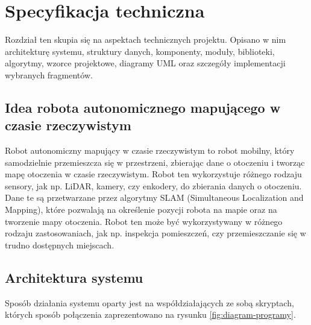 \documentclass[a4paper,twoside,12pt]{book}
\begin{document}
%


\chapter{Specyfikacja techniczna}
\label{ch:05}
Rozdział ten skupia się na aspektach technicznych projektu. Opisano w nim architekturę systemu, struktury danych, komponenty, moduły, biblioteki, algorytmy, wzorce projektowe, diagramy UML oraz szczegóły implementacji wybranych fragmentów.
\section{Idea robota autonomicznego mapującego w czasie rzeczywistym} 
Robot autonomiczny mapujący w czasie rzeczywistym to robot mobilny, który samodzielnie przemieszcza się w przestrzeni, zbierając dane o otoczeniu i tworząc mapę otoczenia w czasie rzeczywistym. Robot ten wykorzystuje różnego rodzaju sensory, jak np. LiDAR, kamery, czy enkodery, do zbierania danych o otoczeniu. Dane te są przetwarzane przez algorytmy SLAM (Simultaneous Localization and Mapping), które pozwalają na określenie pozycji robota na mapie oraz na tworzenie mapy otoczenia. Robot ten może być wykorzystywany w różnego rodzaju zastosowaniach, jak np. inspekcja pomieszczeń, czy przemieszczanie się w trudno dostępnych miejscach.
\newpage
\section{Architektura systemu}
Sposób działania systemu oparty jest na współdziałających ze sobą skryptach, których sposób połączenia zaprezentowano na rysunku \ref{fig:diagram-programy}.
\end{document}
